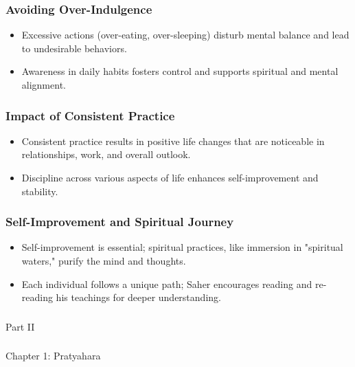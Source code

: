 \begin{frame}[fragile]\frametitle{Avoiding Over-Indulgence}
    \begin{itemize}
        \item Excessive actions (over-eating, over-sleeping) disturb mental balance and lead to undesirable behaviors.
        \item Awareness in daily habits fosters control and supports spiritual and mental alignment.
    \end{itemize}
\end{frame}

\begin{frame}[fragile]\frametitle{Impact of Consistent Practice}
    \begin{itemize}
        \item Consistent practice results in positive life changes that are noticeable in relationships, work, and overall outlook.
        \item Discipline across various aspects of life enhances self-improvement and stability.
    \end{itemize}
\end{frame}

\begin{frame}[fragile]\frametitle{Self-Improvement and Spiritual Journey}
    \begin{itemize}
        \item Self-improvement is essential; spiritual practices, like immersion in "spiritual waters," purify the mind and thoughts.
        \item Each individual follows a unique path; Saher encourages reading and re-reading his teachings for deeper understanding.
    \end{itemize}
\end{frame}



\begin{frame}[fragile]\frametitle{}
\begin{center}
{\Large Part II}
\end{center}
\end{frame}

\begin{frame}[fragile]\frametitle{}
\begin{center}
{\Large Chapter 1: Pratyahara }
\end{center}
\end{frame}


